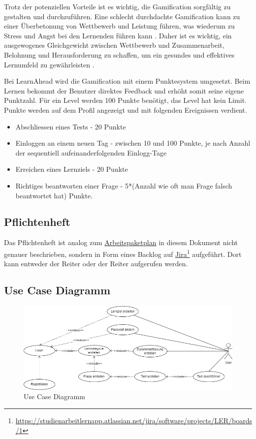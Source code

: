 \newpage
\noindent
Trotz der potenziellen Vorteile ist es wichtig, die Gamification sorgfältig zu gestalten und durchzuführen. Eine schlecht durchdachte Gamification kann zu einer Überbetonung von Wettbewerb und Leistung führen, was wiederum zu Stress und Angst bei den Lernenden führen kann \cite{Nicholson2015}. Daher ist es wichtig, ein ausgewogenes Gleichgewicht zwischen Wettbewerb und Zusammenarbeit, Belohnung und Herausforderung zu schaffen, um ein gesundes und effektives Lernumfeld zu gewährleisten \cite{Deterding2011}.\newline

\noindent
Bei LearnAhead wird die Gamification mit einem Punktesystem umgesetzt. Beim Lernen bekommt der Benutzer direktes Feedback und erhöht somit seine eigene Punktzahl. Für ein Level werden 100 Punkte benötigt, das Level hat kein Limit. Punkte werden auf dem Profil angezeigt und mit folgenden Ereignissen verdient.
\begin{itemize}
  \item Abschliessen eines Tests - 20 Punkte
  \item Einloggen an einem neuen Tag - zwischen 10 und 100 Punkte, je nach Anzahl der sequentiell aufeinanderfolgenden Einlogg-Tage
  \item Erreichen eines Lernziels - 20 Punkte
  \item Richtiges beantworten einer Frage - 5*(Anzahl wie oft man Frage falsch beantwortet hat) Punkte.
\end{itemize}
\subsection{Pflichtenheft}
Das Pflichtenheft ist analog zum
\hyperref[sec:arbeitspaketplan]{Arbeitspaketplan} in diesem Dokument nicht
genauer beschrieben, sondern in Form eines Backlog auf
\href{https://studienarbeitlernapp.atlassian.net/jira/software/projects/LER/boards/1}{\underline{Jira}}\footnote{\href{https://studienarbeitlernapp.atlassian.net/jira/software/projects/LER/boards/1}{https://studienarbeitlernapp.atlassian.net/jira/software/projects/LER/boards/1}}
aufgeführt. Dort kann entweder der Reiter  oder der Reiter
 aufgerufen werden.

\subsection{Use Case Diagramm}

\begin{figure}[H]
  \centering
  \includegraphics[width=1\textwidth]{images/diagramme/UseCase_Diagramm.png}
  \caption{Use Case Diagramm}
  \label{fig:UseCaseDiagramm}
\end{figure}
\newpage
